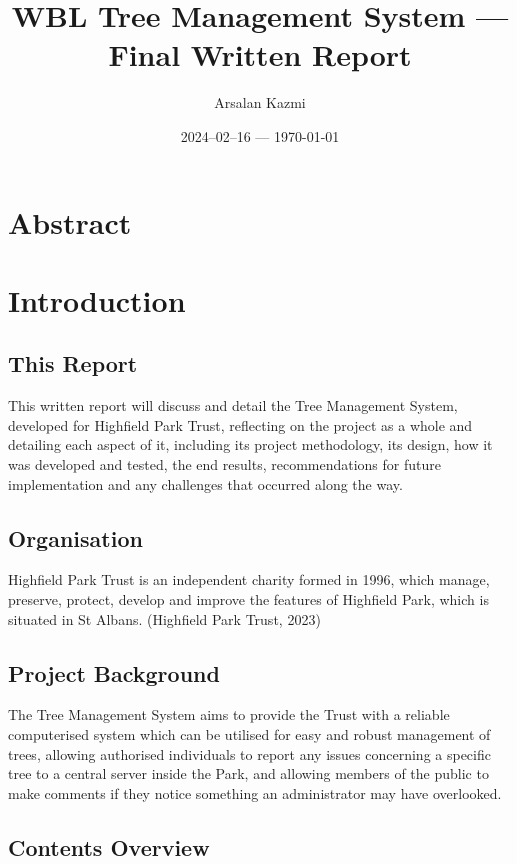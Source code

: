 \documentclass[12pt]{report}
\title{WBL Tree Management System --- Final Written Report}
\author{Arsalan Kazmi}
\date{2024--02--16 --- \today}
\begin{document}
\maketitle

\tableofcontents

\section{Abstract}


\section{Introduction}

\subsection{This Report}

This written report will discuss and detail the Tree Management System,
developed for Highfield Park Trust, reflecting on the project as a whole and
detailing each aspect of it, including its project methodology, its design, how
it was developed and tested, the end results, recommendations for future
implementation and any challenges that occurred along the way.

\subsection{Organisation}

Highfield Park Trust is an independent charity formed in 1996, which manage,
preserve, protect, develop and improve the features of Highfield Park, which
is situated in St Albans. (Highfield Park Trust, 2023)

\subsection{Project Background}

The Tree Management System aims to provide the Trust with a reliable computerised
system which can be utilised for easy and robust management of trees, allowing
authorised individuals to report any issues concerning a specific tree to a
central server inside the Park, and allowing members of the public to make
comments if they notice something an administrator may have overlooked.

\subsection{Contents Overview}
\end{document}
